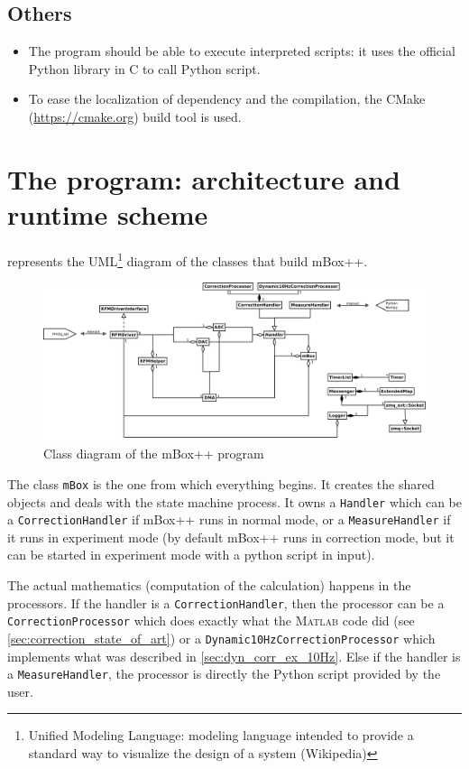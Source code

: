 \subsection{Others}
\begin{itemize}
\item The program should be able to execute interpreted scripts: it uses the official Python library in C to call Python script. 
\item To ease the localization of dependency and the compilation, the CMake (\url{https://cmake.org}) build tool is used.
\end{itemize}

\section{The program: architecture and runtime scheme}

 represents the UML\footnote{Unified Modeling Language: modeling language intended to provide a standard way to visualize the design of a system (Wikipedia)} diagram of the classes that build mBox++.

\begin{figure}
    \includegraphics[width=\linewidth]{img/mBox_classDiagram}
    \caption{\label{fig:mbox_class_diag}Class diagram of the mBox++ program}
\end{figure}

The class \texttt{mBox} is the one from which everything begins. It creates the shared objects and deals with the state machine process. It owns a \texttt{Handler} which can be a \texttt{CorrectionHandler} if mBox++ runs in normal mode, or a \texttt{MeasureHandler} if it runs in experiment mode (by default mBox++ runs in correction mode, but it can be started in experiment mode with a python script in input).

The actual mathematics (computation of the calculation) happens in the processors. If the handler is a \texttt{CorrectionHandler}, then the processor can be a \texttt{CorrectionProcessor} which does exactly what the \textsc{Matlab} code did (see \cref{sec:correction_state_of_art}) or a \texttt{Dynamic10HzCorrectionProcessor} which implements what was described in \cref{sec:dyn_corr_ex_10Hz}. Else if the handler is a \texttt{MeasureHandler}, the processor is directly the Python script provided by the user.

